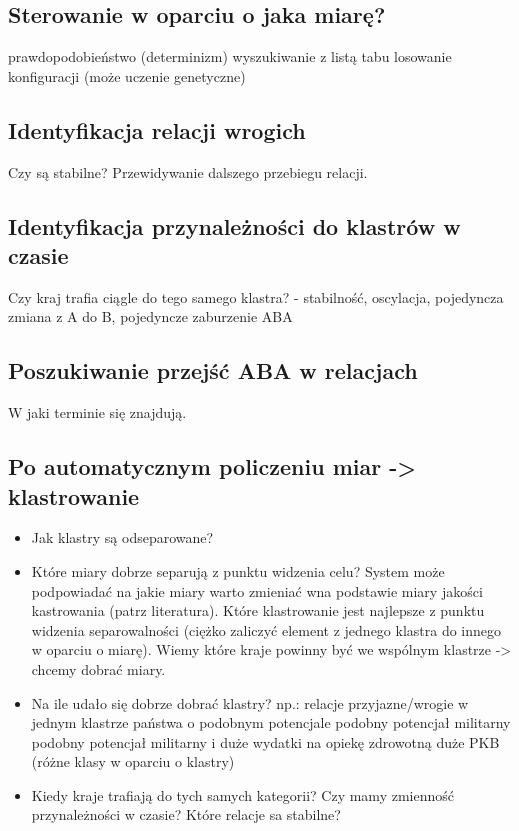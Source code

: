 \documentclass[11pt]{report}
\begin{document}
    \subsection{Sterowanie w oparciu o jaka miarę?}
    prawdopodobieństwo (determinizm)
    wyszukiwanie z listą tabu
    losowanie konfiguracji (może uczenie genetyczne)

    \subsection{Identyfikacja relacji wrogich}
    Czy są stabilne?
    Przewidywanie dalszego przebiegu relacji.

    \subsection{Identyfikacja przynależności do klastrów w czasie}
    Czy kraj trafia ciągle do tego samego klastra?
    - stabilność, oscylacja, pojedyncza zmiana z A do B, pojedyncze zaburzenie ABA

    \subsection{Poszukiwanie przejść ABA w relacjach}
    W jaki terminie się znajdują.

    \subsection{Po automatycznym policzeniu miar -> klastrowanie}
    \begin{itemize}
        \item Jak klastry są odseparowane?
        \item Które miary dobrze separują z punktu widzenia celu?
        System może podpowiadać na jakie miary warto zmieniać wna podstawie miary jakości kastrowania (patrz literatura).
        Które klastrowanie jest najlepsze z punktu widzenia separowalności (ciężko zaliczyć element z jednego klastra do innego w oparciu o miarę).
        Wiemy które kraje powinny być we wspólnym klastrze -> chcemy dobrać miary.

        \item Na ile udało się dobrze dobrać klastry?
        np.: relacje przyjazne/wrogie w jednym klastrze
        państwa o podobnym potencjale
        podobny potencjał militarny
        podobny potencjał militarny i duże wydatki na opiekę zdrowotną
        duże PKB (różne klasy w oparciu o klastry)

        \item Kiedy kraje trafiają do tych samych kategorii?
        Czy mamy zmienność przynależności w czasie?
        Które relacje sa stabilne?
    \end{itemize}
\end{document}
